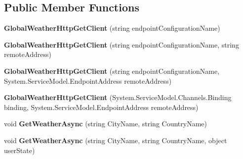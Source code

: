 \subsection*{Public Member Functions}
\begin{DoxyCompactItemize}
\item 
\hypertarget{class_silverlight_showcase_1_1_sample_weather_service_1_1_global_weather_http_get_client_a488ad79284a5c7d57763c32ddb97c1ed}{
{\bfseries GlobalWeatherHttpGetClient} (string endpointConfigurationName)}
\label{class_silverlight_showcase_1_1_sample_weather_service_1_1_global_weather_http_get_client_a488ad79284a5c7d57763c32ddb97c1ed}

\item 
\hypertarget{class_silverlight_showcase_1_1_sample_weather_service_1_1_global_weather_http_get_client_a6809fb9b2916513e7a9d04a290a384f9}{
{\bfseries GlobalWeatherHttpGetClient} (string endpointConfigurationName, string remoteAddress)}
\label{class_silverlight_showcase_1_1_sample_weather_service_1_1_global_weather_http_get_client_a6809fb9b2916513e7a9d04a290a384f9}

\item 
\hypertarget{class_silverlight_showcase_1_1_sample_weather_service_1_1_global_weather_http_get_client_aca83268ea79cf883d88384462fb8e9e0}{
{\bfseries GlobalWeatherHttpGetClient} (string endpointConfigurationName, System.ServiceModel.EndpointAddress remoteAddress)}
\label{class_silverlight_showcase_1_1_sample_weather_service_1_1_global_weather_http_get_client_aca83268ea79cf883d88384462fb8e9e0}

\item 
\hypertarget{class_silverlight_showcase_1_1_sample_weather_service_1_1_global_weather_http_get_client_a148f84596ef3c3b346ddf1cc50528255}{
{\bfseries GlobalWeatherHttpGetClient} (System.ServiceModel.Channels.Binding binding, System.ServiceModel.EndpointAddress remoteAddress)}
\label{class_silverlight_showcase_1_1_sample_weather_service_1_1_global_weather_http_get_client_a148f84596ef3c3b346ddf1cc50528255}

\item 
\hypertarget{class_silverlight_showcase_1_1_sample_weather_service_1_1_global_weather_http_get_client_a6a1dfd44a43d84331248a50a00ee81de}{
void {\bfseries GetWeatherAsync} (string CityName, string CountryName)}
\label{class_silverlight_showcase_1_1_sample_weather_service_1_1_global_weather_http_get_client_a6a1dfd44a43d84331248a50a00ee81de}

\item 
\hypertarget{class_silverlight_showcase_1_1_sample_weather_service_1_1_global_weather_http_get_client_aba192180c2d8f06a11f1e4b34ba9966d}{
void {\bfseries GetWeatherAsync} (string CityName, string CountryName, object userState)}
\label{class_silverlight_showcase_1_1_sample_weather_service_1_1_global_weather_http_get_client_aba192180c2d8f06a11f1e4b34ba9966d}


\end{DoxyCompactItemize}
